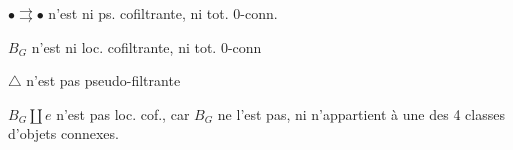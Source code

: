 $\bullet\rightrightarrows\bullet$ n'est ni ps. cofiltrante, ni tot. 0-conn.

$B_G$ n'est ni loc. cofiltrante, ni tot. 0-conn

$\triangle$  n'est pas pseudo-filtrante

$B_G\amalg e$ n'est pas loc. cof., car $B_G$ ne l'est pas, ni n'appartient à une des 4 classes d'objets connexes. 

